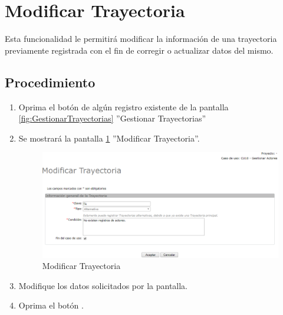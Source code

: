 \hypertarget{cv:modificarTray}{\section{Modificar Trayectoria}} \label{sec:modificarTray}

	Esta funcionalidad le permitirá modificar la información de una trayectoria previamente registrada con el fin de corregir o actualizar datos del mismo. 

		\subsection{Procedimiento}

			\begin{enumerate}
	
			\item Oprima el botón \IUEditar{} de algún registro existente de la pantalla \ref{fig:GestionarTrayectorias} ''Gestionar Trayectorias''
	
			\item Se mostrará la pantalla \ref{fig:modificarTray} ''Modificar Trayectoria''.
			
			\begin{figure}[htbp!]
				\begin{center}
					\includegraphics[scale=0.6]{roles/lider/casosUso/trayectorias/pantallas/IU6-1-1-2modificarTray}
					\caption{Modificar Trayectoria}
					\label{fig:modificarTray}
				\end{center}
			\end{figure}
		
			\item Modifique los datos solicitados por la pantalla.
						
			\item Oprima el botón \IUAceptar.
			

\end{enumerate}
